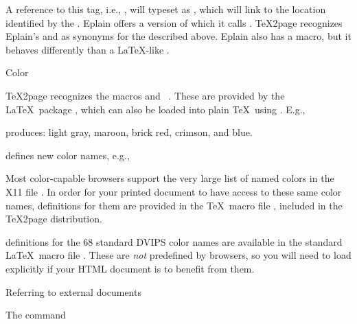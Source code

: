 
\n A reference to this tag, i.e.,
\p{\ref{|meta[alabel]}}, will typeset as
, which will link to the location
identified by the \p{\xrtag}.\f{%
%
Eplain offers a version of \p{\xrtag} which it calls
.  \TeX2page recognizes Eplain's  and
\p{\xrefn} as synonyms for the \p{\ref} described
above.  Eplain also has a \p{\ref} macro, but it
behaves differently than a \LaTeX-like \p{\ref}.}

\beginsection Color

\TeX2page recognizes the macros \p{\color} and
\p{\definecolor}~\cite{latex-graphicx}.  These are provided by the \LaTeX\
package , which can also be loaded into
plain \TeX\ using .  E.g.,


\n produces:
{\color[gray]{.75} light gray},
{\color[rgb]{.69, .19, .38} maroon},
{\color[cmyk]{0, .89, .94, .28} brick red},
{\color[RGB]{220, 20, 60} crimson},
and {\color{blue} blue}.

\p{\definecolor} defines new color names, e.g.,


Most color-capable browsers support the very large list
of named colors in the X11 file .  In order
for your printed document to have access to these same
color names, definitions for them are provided in the
\TeX\ macro file , included in the \TeX2page
distribution.


 definitions for the 68 standard DVIPS
color names are available in the standard \LaTeX\ macro
file .  These are {\em not} predefined
by browsers, so you will need to load \p{dvipsnam.def}
explicitly if your HTML document is to benefit from
them.

 Referring to external documents

%
The command

